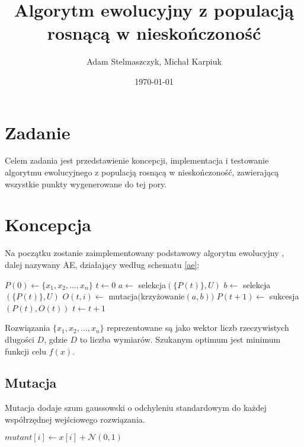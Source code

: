 \documentclass[12pt, a4paper]{article}
\title{\textbf{Algorytm ewolucyjny z populacją rosnącą w nieskończoność}}
\author{Adam Stelmaszczyk, Michał Karpiuk}
\date{\today}
\begin{document}
\maketitle

\section{Zadanie}

Celem zadania jest przedstawienie koncepcji, implementacja i testowanie algorytmu ewolucyjnego z populacją rosnącą
w nieskończoność, zawierającą wszystkie punkty wygenerowane do tej pory.

\section{Koncepcja}

Na początku zostanie zaimplementowany podstawowy algorytm ewolucyjny \cite{jarabas}, dalej nazywany AE, 
działający według schematu \ref{ae}:

\begin{algorithm}[!htb]
\label{ae}
\begin{algorithmic}[1]
  \State $P(0) \gets \{x_1, x_2, \ldots, x_n\}$
  \State $t \gets 0$
      \State $a \gets$ selekcja$(\{P(t)\}, U)$
      \State $b \gets$ selekcja$(\{P(t)\}, U)$
      \State $O(t,i) \gets$ mutacja$($krzy{\.z}owanie$(a, b))$
    \EndFor
    \State $P(t+1) \gets$ sukcesja$(P(t), O(t))$
    \State $t \gets t+1$
  \EndWhile
\EndFunction
\end{algorithmic}
\end{algorithm}

Rozwiązania $\{x_1, x_2, \ldots, x_n\}$ reprezentowane są jako wektor liczb rzeczywistych długości $D$,
gdzie $D$ to liczba wymiarów. Szukanym optimum jest minimum funkcji celu $f(x)$.

\subsection{Mutacja}

Mutacja dodaje szum gaussowski o odchyleniu standardowym do każdej współrzędnej wejściowego rozwiązania.

\begin{algorithm}[!htb]
\begin{algorithmic}[1]
    \State $mutant[i] \gets x[i] + \mathcal{N}(0, 1)$
  \EndFor
\EndFunction
\end{algorithmic}
\end{algorithm}
\end{document}
